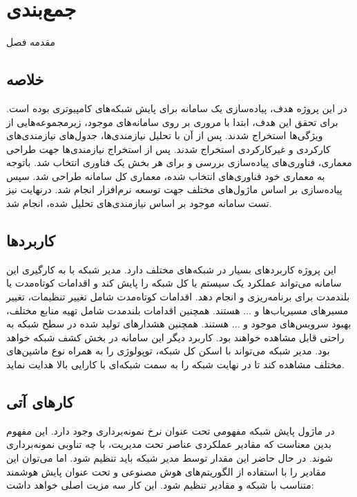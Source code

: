 \chapter{جمع‌بندی}
مقدمه فصل

\section{خلاصه}

در این پروژه هدف، پیاده‌سازی یک سامانه برای پایش شبکه‌های کامپیوتری بوده است. برای تحقق این هدف، ابتدا با مروری بر روی سامانه‌های موجود، زیرمجموعه‌هایی از ویژگی‌ها استخراج شدند. پس از آن با تحلیل نیازمندی‌ها، جدول‌های نیازمندی‌های کارکردی و غیرکارکردی استخراج شدند. پس از استخراج نیازمندی‌ها جهت طراحی معماری، فناوری‌های پیاده‌سازی بررسی و برای هر بخش یک فناوری انتخاب شد. باتوجه به معماری خود فناوری‌های انتخاب شده، معماری کل سامانه طراحی شد. سپس پیاده‌سازی بر اساس ماژول‌های مختلف جهت توسعه نرم‌افزار انجام شد. درنهایت نیز تست سامانه موجود بر اساس نیازمندی‌های تحلیل شده، انجام شد.


\section{کاربرد‌ها}

این پروژه کاربرد‌های بسیار در شبکه‌های مختلف دارد. مدیر شبکه با به کارگیری این سامانه می‌تواند عملکرد یک سیستم یا کل شبکه را پایش کند و اقدامات کوتاه‌مدت یا بلندمدت برای برنامه‌ریزی و انجام دهد. اقدامات کوتاه‌مدت شامل تغییر تنظیمات، تغییر مسیرهای مسیریاب‌ها و ... هستند. همچنین اقدامات بلندمدت شامل تهیه منابع مختلف، بهبود سرویس‌های موجود و ... هستند. همچنین هشدارهای تولید شده در سطح شبکه به راحتی قابل مشاهده خواهند بود. کاربرد دیگر این سامانه در بخش کشف شبکه خواهد بود. مدیر شبکه می‌تواند با اسکن کل شبکه، توپولوژی را به همراه نوع ماشین‌های مختلف مشاهده کند تا در نهایت شبکه را به سمت شبکه‌ای با کارایی بالا هدایت نماید.

\newpage

\section{کار‌های آتی}

در ماژول پایش شبکه مفهومی تحت عنوان نرخ نمونه‌برداری وجود دارد. این مفهوم بدین معناست که مقادیر عملکردی عناصر تحت مدیریت، با چه تناوبی نمونه‌برداری شوند. در حال حاضر این مقدار توسط مدیر شبکه باید تنظیم شود. اما می‌توان این مقادیر را با استفاده از الگوریتم‌های هوش مصنوعی و تحت عنوان پایش هوشمند متناسب با شبکه و مقادیر تنظیم شود. این کار سه مزیت اصلی خواهد داشت:

